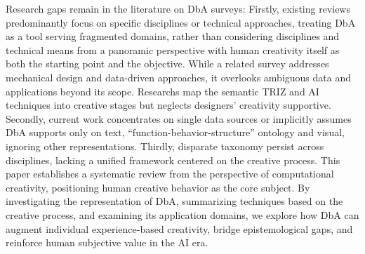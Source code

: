 Research gaps remain in the literature on DbA surveys: Firstly, existing reviews predominantly focus on specific disciplines or technical approaches, treating DbA as a tool serving fragmented domains, rather than considering disciplines and technical means from a panoramic perspective with human creativity itself as both the starting point and the objective. While a related survey\cite{jiang2022data} addresses mechanical design and data-driven approaches, it overlooks ambiguous data and applications beyond its scope. Researchs map the semantic TRIZ and AI techniques into creative stages but neglects designers' creativity supportive\cite{khanolkar2023mapping, ghane2024semantic}. Secondly, current work concentrates on single data sources or implicitly assumes DbA supports only on text, ``function-behavior-structure'' ontology and visual, ignoring other representations. Thirdly, disparate taxonomy persist across disciplines, lacking a unified framework centered on the creative process. This paper establishes a systematic review from the perspective of computational creativity, positioning human creative behavior as the core subject. By investigating the representation of DbA, summarizing techniques based on the creative process, and examining its application domains, we explore how DbA can augment individual experience-based creativity, bridge epistemological gaps, and reinforce human subjective value in the AI era.





























